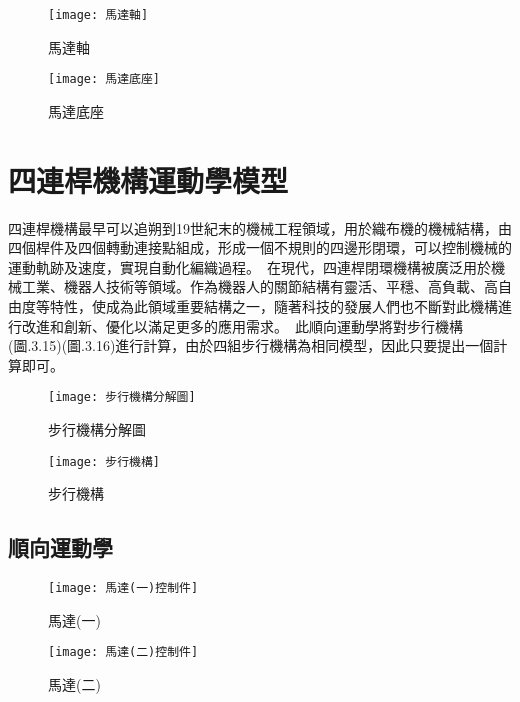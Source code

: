 \begin{figure}[htbp]
  \centering
  \begin{minipage}{0.3\textwidth}
    \centering
    \texttt{[image: 馬達軸]}
    \caption{馬達軸}
    \label{馬達軸}
  \end{minipage}
  \hfill
  \begin{minipage}{0.3\textwidth}
    \centering
    \texttt{[image: 馬達底座]}
    \caption{馬達底座}
    \label{馬達底座}
  \end{minipage}
 \end{figure}
\newpage

\section{四連桿機構運動學模型}

四連桿機構最早可以追朔到19世紀末的機械工程領域，用於織布機的機械結構，由四個桿件及四個轉動連接點組成，形成一個不規則的四邊形閉環，可以控制機械的運動軌跡及速度，實現自動化編織過程。\
在現代，四連桿閉環機構被廣泛用於機械工業、機器人技術等領域。作為機器人的關節結構有靈活、平穩、高負載、高自由度等特性，使成為此領域重要結構之一，隨著科技的發展人們也不斷對此機構進行改進和創新、優化以滿足更多的應用需求。\
此順向運動學將對步行機構(圖.3.15)(圖.3.16)進行計算，由於四組步行機構為相同模型，因此只要提出一個計算即可。\\
\begin{figure}[htbp]
  \begin{minipage}[t]{0.45\linewidth}
    \centering
    \texttt{[image: 步行機構分解圖]}
    \caption{步行機構分解圖}
    \label{步行機構分解圖}
  \end{minipage}
  \hfill
  \begin{minipage}[t]{0.45\linewidth}
    \centering
    \texttt{[image: 步行機構]}
    \caption{步行機構}
    \label{步行機構}
  \end{minipage}
\end{figure}
\newpage

\subsection{順向運動學}
\begin{figure}[htbp]
  \begin{minipage}[t]{0.5\linewidth}
    \centering
    \texttt{[image: 馬達(一)控制件]}
    \caption{馬達(一)}
    \label{馬達(一)控制件}
  \end{minipage}
  \hfill
  \begin{minipage}[t]{0.5\linewidth}
    \centering
    \texttt{[image: 馬達(二)控制件]}
    \caption{馬達(二)}
    \label{馬達(二)控制件}
  \end{minipage}
\end{figure}

